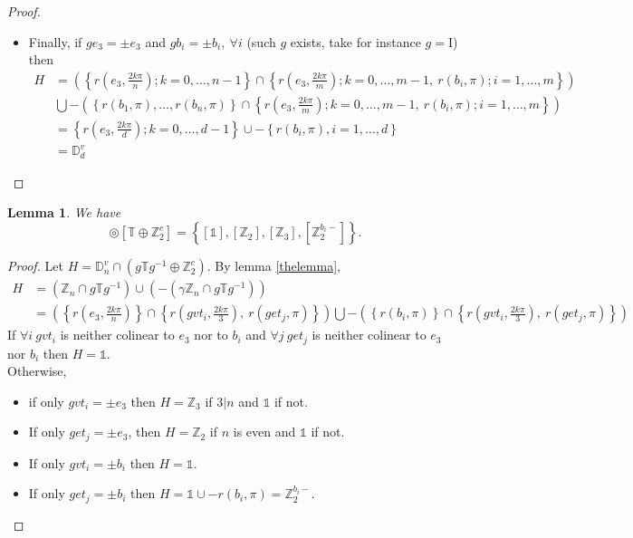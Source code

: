 \documentclass[11pt,a4paper]{amsart}
\newtheorem{lem}[thm]{Lemma}
\theoremstyle{definition}
\newcommand{\ZZ}{\mathbb{Z}}                %
\newcommand{\tetra}{\mathbb{T}}             %
\newcommand{\DD}{\mathbb{D}}                %
\newcommand{\1}{\mathds{1}}		            %
\newcommand{\id}{\mathrm{I}}                %
\newcommand{\set}[1]{\left\{#1\right\}}     %
\begin{document}
\begin{proof}
\begin{itemize}
\item Finally, if $ge_3=\pm e_3$ and $gb_i=\pm b_i,\ \forall i$ (such $g$ exists, take for instance $g=\id$) then
\begin{align*}
H&=\left(\set{r(e_3,\frac{2k\pi}{n});k=0,\dotsc, n-1}\cap \set{r(e_3,\frac{2k\pi}{m});k=0,\dotsc, m-1,\ r(b_i,\pi); i=1,\dotsc,m}\right)\\
           & \bigcup -\left(\set{r(b_1,\pi),\dotsc,r(b_n,\pi)}\cap \set{r(e_3,\frac{2k\pi}{m});k=0,\dotsc, m-1,\ r(b_i,\pi); i=1,\dotsc,m}\right)\\
           &=\set{r(e_3,\frac{2k\pi}{d});k=0,\dotsc,d-1}\cup-\set{r(b_i,\pi),i=1,\dotsc,d}\\
           &=\DD_d^v
\end{align*}
\end{itemize}
\end{proof}

\begin{lem}
We have
\begin{equation*}
[\DD_{n}^{v}] \circledcirc [\tetra \oplus \ZZ_2^c]=\set{[\1],[\ZZ_2],[\ZZ_3],[\ZZ_{2}^{b_i-}]}.
\end{equation*}
\end{lem}
\begin{proof}
Let $H=\DD_{n}^v \cap(g \tetra g^{-1}\oplus \ZZ_2^c)$.
By lemma \ref{thelemma},
\begin{align*}
H&=(\ZZ_n\cap g \tetra g^{-1})\cup (-(\gamma\ZZ_n\cap g \tetra g^{-1}))\\
 &=\left(\set{r(e_3,\frac{2k\pi}{n})}\cap \set{r(gvt_i,\frac{2k\pi}{3}),\ r(get_j,\pi)}\right)\bigcup-\left(\set{r(b_i,\pi)}\cap \set{r(gvt_i,\frac{2k\pi}{3}),\ r(get_j,\pi)}\right)
\end{align*}
If $\forall i\ gvt_i$ is neither colinear to $e_3$ nor to $b_i$ and $\forall j\ get_j$ is neither colinear to $e_3$ nor $b_i$ then $H=\1$.\\
Otherwise,
\begin{itemize}
\item if only $gvt_i=\pm e_3$ then $H=\ZZ_3$ if $3|n$ and $\1$ if not.
\item If only $get_j=\pm e_3$, then $H=\ZZ_2$ if $n$ is even and $\1$ if not.
\item If only $gvt_i=\pm b_i$ then $H=\1$.
\item If only $get_j=\pm b_i$ then $H=\1\cup -{r(b_i,\pi)}=\ZZ_2^{b_i-}.$
\end{itemize}
\end{proof}
\end{document}

